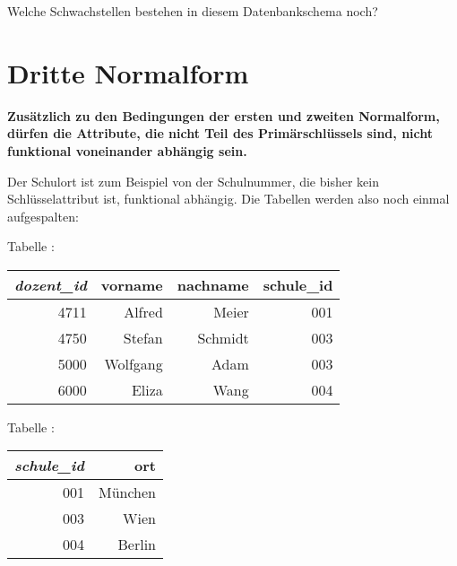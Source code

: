 Welche Schwachstellen bestehen in diesem Datenbankschema noch?


\section{Dritte Normalform}

\textbf{Zusätzlich zu den Bedingungen der ersten und zweiten Normalform, dürfen
die Attribute, die nicht Teil des Primärschlüssels sind, nicht funktional
voneinander abhängig sein.}

Der Schulort ist zum Beispiel von der Schulnummer, die bisher kein
Schlüsselattribut ist, funktional abhängig. Die Tabellen werden also noch
einmal aufgespalten:

\begin{minipage}{0.7\textwidth}
Tabelle :

\vspace{2mm}

\hspace{0mm}
\begin{tabular}{|r|r|r|r|}\hline
\textbf{\em dozent\_id} & \textbf{vorname} & \textbf{nachname} &
\textbf{schule\_id}\\ \hline 
4711 & Alfred & Meier   & 001\\ \hline
4750 & Stefan & Schmidt & 003\\ \hline
5000 & Wolfgang & Adam    & 003\\ \hline
6000 & Eliza & Wang    & 004\\ \hline
\end{tabular}
\end{minipage}
\begin{minipage}{0.20\textwidth}
Tabelle :

\vspace{2mm}

\begin{tabular}{|r|r|}\hline
\textbf{\em schule\_id} & \textbf{ort}\\ \hline
001 & München\\ \hline
003 & Wien   \\ \hline
004 & Berlin \\ \hline
\end{tabular}
\end{minipage}

\vspace{4mm}


